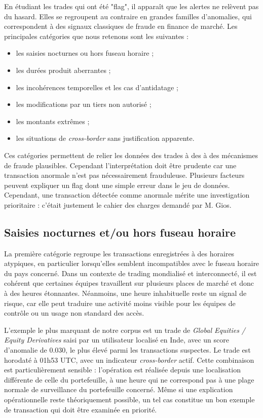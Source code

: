 \documentclass[a4paper]{article}
\begin{document}
En étudiant les trades qui ont été "flag", il apparaît que les alertes ne relèvent pas du hasard. Elles se regroupent au contraire en grandes familles d'anomalies, qui correspondent à des signaux classiques de fraude en finance de marché. Les principales catégories que nous retenons sont les suivantes :
\begin{itemize}
    \item les saisies nocturnes ou hors fuseau horaire ;
    \item les durées produit aberrantes ;
    \item les incohérences temporelles et les cas d'antidatage ;
    \item les modifications par un tiers non autorisé ;
    \item les montants extrêmes ;
    \item les situations de \textit{cross-border} sans justification apparente.
\end{itemize}

Ces catégories permettent de relier les données des trades à des à des mécanismes de fraude plausibles. Cependant l'interprétation doit être prudente car une transaction anormale n'est pas nécessairement frauduleuse. Plusieurs facteurs peuvent expliquer un flag dont une simple erreur dans le jeu de données. Cependant, une transaction détectée comme anormale mérite une investigation prioritaire : c'était justement le cahier des charges demandé par M. Gios. 


\subsection{Saisies nocturnes et/ou hors fuseau horaire}

La première catégorie regroupe les transactions enregistrées à des horaires atypiques, en particulier lorsqu'elles semblent incompatibles avec le fuseau horaire du pays concerné. Dans un contexte de trading mondialisé et interconnecté, il est cohérent que  certaines équipes travaillent sur plusieurs places de marché et donc à des heures étonnantes. Néanmoins, une heure inhabituelle reste un signal de risque, car elle peut traduire une activité moins visible pour les équipes de contrôle ou un usage non standard des accès.

L'exemple le plus marquant de notre corpus est un trade de \textit{Global Equities / Equity Derivatives} saisi par un utilisateur localisé en Inde, avec un score d'anomalie de 0.030, le plus élevé parmi les transactions suspectes. Le trade est horodaté à 01h53 UTC, avec un indicateur \textit{cross-border} actif. Cette combinaison est particulièrement sensible : l'opération est réalisée depuis une localisation différente de celle du portefeuille, à une heure qui ne correspond pas à une plage normale de surveillance du portefeuille concerné. Même si une explication opérationnelle reste théoriquement possible, un tel cas constitue un bon exemple de transaction qui doit être examinée en priorité. 
\end{document}
